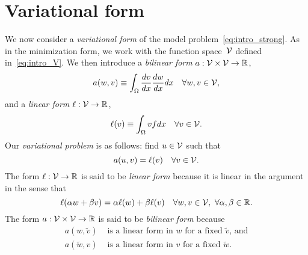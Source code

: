 \section{Variational form}
We now consider a \emph{variational form} of the model problem~\eqref{eq:intro_strong}. As in the minimization form, we work with the function space~$\mathcal{V}$ defined in~\eqref{eq:intro_V}. We then introduce a \emph{bilinear form} $a: \mathcal{V} \times \mathcal{V} \to \mathbb{R}$,
\begin{equation}
  a(w,v) \equiv \int_{\Omega} \frac{d v}{d x} \frac{d w}{d x} dx \quad \forall w, v \in \mathcal{V},
  \label{eq:intro_a}
\end{equation}
and a \emph{linear form} $\ell: \mathcal{V} \to \mathbb{R}$,
\begin{equation}
  \ell(v) \equiv \int_{\Omega} v f dx \quad \forall v \in \mathcal{V}.
  \label{eq:intro_ell}
\end{equation}
Our \emph{variational problem} is as follows: find $u \in \mathcal{V}$ such that
\begin{equation}
  a(u,v) = \ell(v) \quad \forall v \in \mathcal{V}.
  \label{eq:intro_var}
\end{equation}
The form $\ell: \mathcal{V} \to \mathbb{R}$ is said to be \emph{linear form} because it is linear in the argument in the sense that
\begin{equation*}
  \ell(\alpha w + \beta v) = \alpha \ell(w) + \beta \ell(v) \quad \forall w,v \in \mathcal{V}, \ \forall \alpha, \beta \in \mathbb{R}.
\end{equation*}
The form $a: \mathcal{V} \times \mathcal{V} \to \mathbb{R}$ is said to be \emph{bilinear form} because 
\begin{align*}
  a(w, \tilde v) & \text{ is a linear form in $w$ for a fixed $\tilde v$, and} \\
  a(\tilde w, v) & \text{ is a linear form in $v$ for a fixed $\tilde w$}.
\end{align*}

